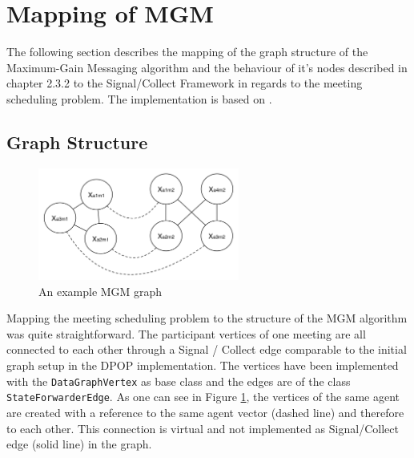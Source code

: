 \section{Mapping of MGM}

The following section describes the mapping of the graph structure of the Maximum-Gain Messaging algorithm and the behaviour of it's nodes described in chapter 2.3.2 to the Signal/Collect Framework in regards to the meeting scheduling problem. The implementation is based on \cite{Chapman2010}.

\subsection{Graph Structure}
\begin{figure}[H]
\includegraphics[width=250px]{graphics/mgm_graph}
\centering
\caption{An example MGM graph}
\label{fig:mgm_graph}
\end{figure}

Mapping the meeting scheduling problem to the structure of the MGM algorithm was quite straightforward. The participant vertices of one meeting are all connected to each other through a Signal / Collect edge comparable to the initial graph setup in the DPOP implementation. The vertices have been implemented with the \texttt{DataGraphVertex} as base class and the edges are of the class \texttt{StateForwarderEdge}. As one can see in Figure \ref{fig:mgm_graph}, the vertices of the same agent are created with a reference to the same agent vector (dashed line) and therefore to each other. This connection is virtual and not implemented as Signal/Collect edge (solid line) in the graph.

